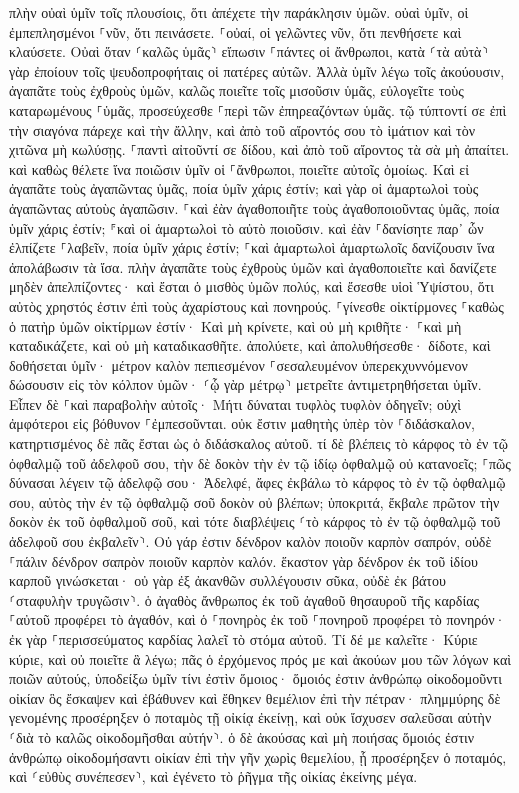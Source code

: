 \documentclass[twoside, 9pt]{extreport}
\begin{document}
πλὴν οὐαὶ ὑμῖν τοῖς πλουσίοις, ὅτι ἀπέχετε τὴν παράκλησιν ὑμῶν. 
οὐαὶ ὑμῖν, οἱ ἐμπεπλησμένοι ⸀νῦν, ὅτι πεινάσετε. ⸀οὐαί, οἱ γελῶντες νῦν, ὅτι πενθήσετε καὶ κλαύσετε. 
Οὐαὶ ὅταν ⸂καλῶς ὑμᾶς⸃ εἴπωσιν ⸀πάντες οἱ ἄνθρωποι, κατὰ ⸂τὰ αὐτὰ⸃ γὰρ ἐποίουν τοῖς ψευδοπροφήταις οἱ πατέρες αὐτῶν. 
Ἀλλὰ ὑμῖν λέγω τοῖς ἀκούουσιν, ἀγαπᾶτε τοὺς ἐχθροὺς ὑμῶν, καλῶς ποιεῖτε τοῖς μισοῦσιν ὑμᾶς, 
εὐλογεῖτε τοὺς καταρωμένους ⸀ὑμᾶς, προσεύχεσθε ⸀περὶ τῶν ἐπηρεαζόντων ὑμᾶς. 
τῷ τύπτοντί σε ἐπὶ τὴν σιαγόνα πάρεχε καὶ τὴν ἄλλην, καὶ ἀπὸ τοῦ αἴροντός σου τὸ ἱμάτιον καὶ τὸν χιτῶνα μὴ κωλύσῃς. 
⸀παντὶ αἰτοῦντί σε δίδου, καὶ ἀπὸ τοῦ αἴροντος τὰ σὰ μὴ ἀπαίτει. 
καὶ καθὼς θέλετε ἵνα ποιῶσιν ὑμῖν οἱ ⸀ἄνθρωποι, ποιεῖτε αὐτοῖς ὁμοίως. 
Καὶ εἰ ἀγαπᾶτε τοὺς ἀγαπῶντας ὑμᾶς, ποία ὑμῖν χάρις ἐστίν; καὶ γὰρ οἱ ἁμαρτωλοὶ τοὺς ἀγαπῶντας αὐτοὺς ἀγαπῶσιν. 
⸀καὶ ἐὰν ἀγαθοποιῆτε τοὺς ἀγαθοποιοῦντας ὑμᾶς, ποία ὑμῖν χάρις ἐστίν; ⸁καὶ οἱ ἁμαρτωλοὶ τὸ αὐτὸ ποιοῦσιν. 
καὶ ἐὰν ⸀δανίσητε παρ᾽ ὧν ἐλπίζετε ⸀λαβεῖν, ποία ὑμῖν χάρις ἐστίν; ⸀καὶ ἁμαρτωλοὶ ἁμαρτωλοῖς δανίζουσιν ἵνα ἀπολάβωσιν τὰ ἴσα. 
πλὴν ἀγαπᾶτε τοὺς ἐχθροὺς ὑμῶν καὶ ἀγαθοποιεῖτε καὶ δανίζετε μηδὲν ἀπελπίζοντες· καὶ ἔσται ὁ μισθὸς ὑμῶν πολύς, καὶ ἔσεσθε υἱοὶ Ὑψίστου, ὅτι αὐτὸς χρηστός ἐστιν ἐπὶ τοὺς ἀχαρίστους καὶ πονηρούς. 
⸀γίνεσθε οἰκτίρμονες ⸀καθὼς ὁ πατὴρ ὑμῶν οἰκτίρμων ἐστίν· 
Καὶ μὴ κρίνετε, καὶ οὐ μὴ κριθῆτε· ⸀καὶ μὴ καταδικάζετε, καὶ οὐ μὴ καταδικασθῆτε. ἀπολύετε, καὶ ἀπολυθήσεσθε· 
δίδοτε, καὶ δοθήσεται ὑμῖν· μέτρον καλὸν πεπιεσμένον ⸀σεσαλευμένον ὑπερεκχυννόμενον δώσουσιν εἰς τὸν κόλπον ὑμῶν· ⸂ᾧ γὰρ μέτρῳ⸃ μετρεῖτε ἀντιμετρηθήσεται ὑμῖν. 
Εἶπεν δὲ ⸀καὶ παραβολὴν αὐτοῖς· Μήτι δύναται τυφλὸς τυφλὸν ὁδηγεῖν; οὐχὶ ἀμφότεροι εἰς βόθυνον ⸀ἐμπεσοῦνται. 
οὐκ ἔστιν μαθητὴς ὑπὲρ τὸν ⸀διδάσκαλον, κατηρτισμένος δὲ πᾶς ἔσται ὡς ὁ διδάσκαλος αὐτοῦ. 
τί δὲ βλέπεις τὸ κάρφος τὸ ἐν τῷ ὀφθαλμῷ τοῦ ἀδελφοῦ σου, τὴν δὲ δοκὸν τὴν ἐν τῷ ἰδίῳ ὀφθαλμῷ οὐ κατανοεῖς; 
⸀πῶς δύνασαι λέγειν τῷ ἀδελφῷ σου· Ἀδελφέ, ἄφες ἐκβάλω τὸ κάρφος τὸ ἐν τῷ ὀφθαλμῷ σου, αὐτὸς τὴν ἐν τῷ ὀφθαλμῷ σοῦ δοκὸν οὐ βλέπων; ὑποκριτά, ἔκβαλε πρῶτον τὴν δοκὸν ἐκ τοῦ ὀφθαλμοῦ σοῦ, καὶ τότε διαβλέψεις ⸂τὸ κάρφος τὸ ἐν τῷ ὀφθαλμῷ τοῦ ἀδελφοῦ σου ἐκβαλεῖν⸃. 
Οὐ γάρ ἐστιν δένδρον καλὸν ποιοῦν καρπὸν σαπρόν, οὐδὲ ⸀πάλιν δένδρον σαπρὸν ποιοῦν καρπὸν καλόν. 
ἕκαστον γὰρ δένδρον ἐκ τοῦ ἰδίου καρποῦ γινώσκεται· οὐ γὰρ ἐξ ἀκανθῶν συλλέγουσιν σῦκα, οὐδὲ ἐκ βάτου ⸂σταφυλὴν τρυγῶσιν⸃. 
ὁ ἀγαθὸς ἄνθρωπος ἐκ τοῦ ἀγαθοῦ θησαυροῦ τῆς καρδίας ⸀αὐτοῦ προφέρει τὸ ἀγαθόν, καὶ ὁ ⸀πονηρὸς ἐκ τοῦ ⸀πονηροῦ προφέρει τὸ πονηρόν· ἐκ γὰρ ⸀περισσεύματος καρδίας λαλεῖ τὸ στόμα αὐτοῦ. 
Τί δέ με καλεῖτε· Κύριε κύριε, καὶ οὐ ποιεῖτε ἃ λέγω; 
πᾶς ὁ ἐρχόμενος πρός με καὶ ἀκούων μου τῶν λόγων καὶ ποιῶν αὐτούς, ὑποδείξω ὑμῖν τίνι ἐστὶν ὅμοιος· 
ὅμοιός ἐστιν ἀνθρώπῳ οἰκοδομοῦντι οἰκίαν ὃς ἔσκαψεν καὶ ἐβάθυνεν καὶ ἔθηκεν θεμέλιον ἐπὶ τὴν πέτραν· πλημμύρης δὲ γενομένης προσέρηξεν ὁ ποταμὸς τῇ οἰκίᾳ ἐκείνῃ, καὶ οὐκ ἴσχυσεν σαλεῦσαι αὐτὴν ⸂διὰ τὸ καλῶς οἰκοδομῆσθαι αὐτήν⸃. 
ὁ δὲ ἀκούσας καὶ μὴ ποιήσας ὅμοιός ἐστιν ἀνθρώπῳ οἰκοδομήσαντι οἰκίαν ἐπὶ τὴν γῆν χωρὶς θεμελίου, ᾗ προσέρηξεν ὁ ποταμός, καὶ ⸂εὐθὺς συνέπεσεν⸃, καὶ ἐγένετο τὸ ῥῆγμα τῆς οἰκίας ἐκείνης μέγα. 
\end{document}
